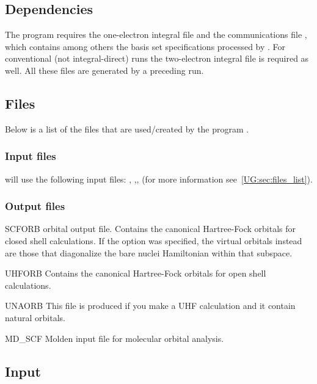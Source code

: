 \subsection{Dependencies}
\label{UG:sec:scf_dependencies}
The  program requires the one-{}electron integral file
 and the communications file ,
which contains among others the
basis set specifications processed by . For conventional
(not integral-direct) runs the two-{}electron integral file 
is required as well. All these files are generated by a preceding
 run.

\subsection{Files}
\label{UG:sec:scf_files}

Below is a list of the files that are used/created by the program
.

\subsubsection{Input files}
 will use the following input
files: , ,, 
(for more information see~\ref{UG:sec:files_list}).


\subsubsection{Output files}

\begin{filelist}
\item[SCFORB]
 orbital output file.
Contains the canonical Hartree-Fock orbitals for closed shell calculations.
If the  option
was specified, the virtual orbitals instead are those that diagonalize the bare
nuclei Hamiltonian within that subspace.
\item[UHFORB]
Contains the canonical Hartree-Fock orbitals for open shell calculations.
\item[UNAORB]
This file is produced if you make a UHF calculation and it contain
natural orbitals.
\item[MD\_SCF]
Molden input file for molecular orbital analysis.
\end{filelist}

\subsection{Input}
\label{UG:sec:scf_inpscf}

